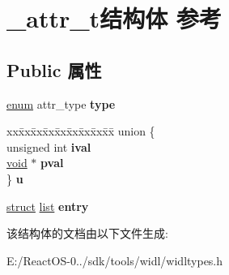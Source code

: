 \hypertarget{struct__attr__t}{}\section{\+\_\+attr\+\_\+t结构体 参考}
\label{struct__attr__t}
\subsection*{Public 属性}
\begin{DoxyCompactItemize}
\item 
\mbox{\label{struct__attr__t_abd668674b75538942033c9cf8785c429}} 
\hyperlink{interfaceenum}{enum} attr\+\_\+type {\bfseries type}
\item 
\mbox{\label{struct__attr__t_a8cd41770337157b645ee144c6c975581}} 
\begin{tabbing}
xx\=xx\=xx\=xx\=xx\=xx\=xx\=xx\=xx\=\kill
union \{\\
\>unsigned int {\bfseries ival}\\
\>\hyperlink{interfacevoid}{void} $\ast$ {\bfseries pval}\\
\} {\bfseries u}\\

\end{tabbing}\item 
\mbox{\label{struct__attr__t_a40a472cf69c625b107005c7a1e32da8a}} 
\hyperlink{interfacestruct}{struct} \hyperlink{classlist}{list} {\bfseries entry}
\end{DoxyCompactItemize}


该结构体的文档由以下文件生成\+:\begin{DoxyCompactItemize}
\item 
E\+:/\+React\+O\+S-\/0../sdk/tools/widl/widltypes.\+h\end{DoxyCompactItemize}
